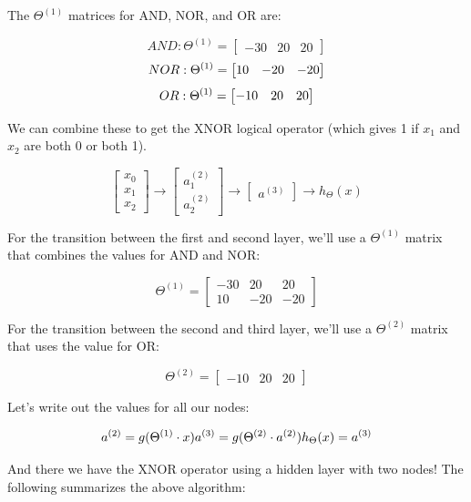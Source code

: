 \documentclass[UTF8]{article}
\begin{document}
The $\Theta^{(1)}$ matrices for AND, NOR, and OR are:

\[ AND:\Theta^{(1)} =\begin{bmatrix}-30 & 20 & 20\end{bmatrix} \]
\[ NOR:\newline\Theta^{(1)} = \begin{bmatrix}10 & -20 & -20\end{bmatrix} \]
\[ OR:\newline\Theta^{(1)} = \begin{bmatrix}-10 & 20 & 20\end{bmatrix} \]

We can combine these to get the XNOR logical operator (which gives 1 if $x_1$ and $x_2$ are both 0 or both 1).

\[\begin{bmatrix}x_0 \\ x_1 \\ x_2\end{bmatrix} \rightarrow\begin{bmatrix}a_1^{(2)} \\ a_2^{(2)} \end{bmatrix} \rightarrow\begin{bmatrix}a^{(3)}\end{bmatrix} \rightarrow h_\Theta(x)\]

For the transition between the first and second layer, we'll use a $\Theta^{(1)}$ matrix that combines the values for AND and NOR:

$$\Theta^{(1)} =\begin{bmatrix}-30 & 20 & 20 \\ 10 & -20 & -20\end{bmatrix}$$

For the transition between the second and third layer, we'll use a $\Theta^{(2)}$ matrix that uses the value for OR:

$$\Theta^{(2)} =\begin{bmatrix}-10 & 20 & 20\end{bmatrix}$$

Let's write out the values for all our nodes:

$$a^{(2)} = g(\Theta^{(1)} \cdot x) \\ a^{(3)} = g(\Theta^{(2)} \cdot a^{(2)}) \\ h_\Theta(x) = a^{(3)}$$

And there we have the XNOR operator using a hidden layer with two nodes! The following summarizes the above algorithm:
\end{document}
